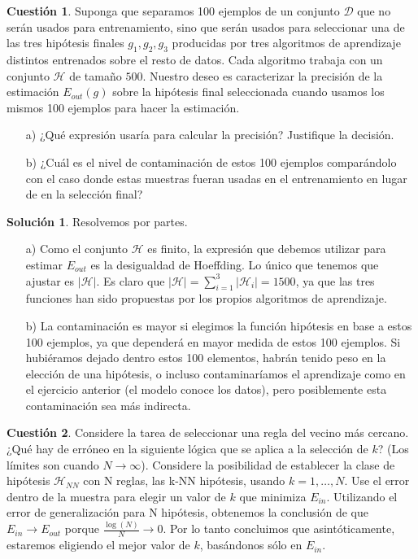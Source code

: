 \documentclass[a4paper, 11pt]{article}
\theoremstyle{definition}
\newtheorem{cuestion}{Cuestión}
\newtheorem*{solucion}{Solución}
\begin{document}
  \begin{cuestion}
    Suponga que separamos 100 ejemplos de un conjunto $\mathcal{D}$ que no serán usados para entrenamiento, sino que serán usados para seleccionar una de las tres hipótesis finales $g_1,g_2,g_3$ producidas por tres algoritmos de aprendizaje distintos entrenados sobre el resto de datos. Cada algoritmo trabaja con un conjunto $\mathcal{H}$ de tamaño $500$. Nuestro deseo es caracterizar la precisión de la estimación $E_{out}(g)$ sobre la hipótesis final seleccionada cuando usamos los mismos 100 ejemplos para hacer la estimación.

    \begin{enumerate}
      \item[a)] ¿Qué expresión usaría para calcular la precisión? Justifique la decisión.
      \item[b)] ¿Cuál es el nivel de contaminación de estos 100 ejemplos comparándolo con el caso donde estas muestras fueran usadas en el entrenamiento en lugar de en la selección final?
    \end{enumerate}
  \end{cuestion}

  \begin{solucion}
    Resolvemos por partes.
    \begin{enumerate}
      \item[a)] Como el conjunto $\mathcal{H}$ es finito, la expresión que debemos utilizar para estimar $E_{out}$ es la desigualdad de Hoeffding. Lo único que tenemos que ajustar es $|\mathcal{H}|$. Es claro que $|\mathcal{H}| = \sum_{i=1}^3 |\mathcal{H}_i| = 1500$, ya que las tres funciones han sido propuestas por los propios algoritmos de aprendizaje.
      \item[b)] La contaminación es mayor si elegimos la función hipótesis en base a estos 100 ejemplos, ya que dependerá en mayor medida de estos 100 ejemplos. Si hubiéramos dejado dentro estos 100 elementos, habrán tenido peso en la elección de una hipótesis, o incluso contaminaríamos el aprendizaje como en el ejercicio anterior (el modelo conoce los datos), pero posiblemente esta contaminación sea más indirecta.
    \end{enumerate}


  \end{solucion}

  \begin{cuestion}
    Considere la tarea de seleccionar una regla del vecino más cercano. ¿Qué hay de erróneo en la siguiente lógica que se aplica a la selección de $k$? (Los límites son cuando $N \rightarrow \infty$).
    Considere la posibilidad de establecer la clase de hipótesis $\mathcal{H}_{NN}$ con N reglas, las k-NN hipótesis, usando $k=1,\ldots,N$. Use el error dentro de la muestra para elegir un valor de $k$ que minimiza $E_{in}$. Utilizando el error de generalización para N hipótesis, obtenemos la conclusión de que $E_{in} \rightarrow E_{out}$ porque $\frac{\log(N)}{N} \rightarrow 0$. Por lo tanto concluimos que asintóticamente, estaremos eligiendo el mejor valor de $k$, basándonos sólo en $E_{in}$.
  \end{cuestion}
\end{document}
